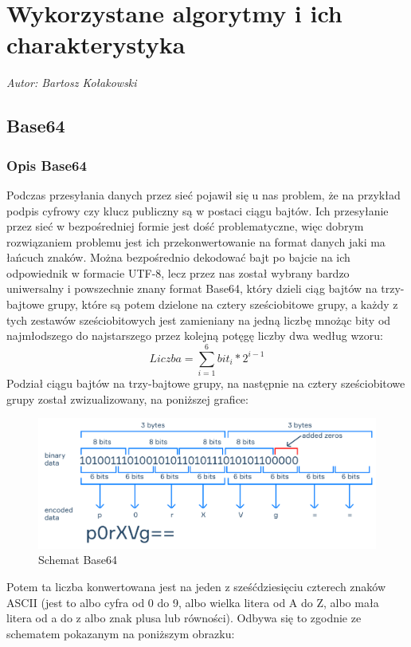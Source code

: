 \chapter{Wykorzystane algorytmy i ich charakterystyka}
\label{chap:Algorytmy}
\textit{Autor: Bartosz Kołakowski}
\setlength{\parindent}{0pt}
\section{Base64}
\label{sec:Base64}
\subsection{Opis Base64}
\label{sec:Base64Opis}
Podczas przesyłania danych przez sieć pojawił się u nas problem, że na przykład podpis cyfrowy czy klucz publiczny są w postaci ciągu bajtów. Ich przesyłanie przez sieć w bezpośredniej formie jest dość problematyczne, więc dobrym rozwiązaniem problemu jest ich przekonwertowanie na format danych jaki ma łańcuch znaków. Można bezpośrednio dekodować bajt po bajcie na ich odpowiednik w formacie UTF-8, lecz przez nas został wybrany bardzo uniwersalny i powszechnie znany format Base64, który dzieli ciąg bajtów na trzy-bajtowe grupy, które są potem dzielone na cztery sześciobitowe grupy, a każdy z tych zestawów sześciobitowych jest zamieniany na jedną liczbę mnożąc bity od najmłodszego do najstarszego przez kolejną potęgę liczby dwa według wzoru:
\begin{equation}
    Liczba = \sum_{i=1}^6 bit_i * 2^{i-1}
\end{equation}
Podział ciągu bajtów na trzy-bajtowe grupy, na następnie na cztery sześciobitowe grupy został zwizualizowany, na poniższej grafice:
\begin{figure}[H]
    \centering
    \includegraphics[width=\textwidth]{Images/Base64Schema.png}
    \caption{Schemat Base64}
	\label{fig:Base64Schema}
\end{figure}
Potem ta liczba konwertowana jest na jeden z sześćdziesięciu czterech znaków ASCII (jest to albo cyfra od 0 do 9, albo wielka litera od A do Z, albo mała litera od a do z albo znak plusa lub równości). Odbywa się to zgodnie ze schematem pokazanym na poniższym obrazku:
